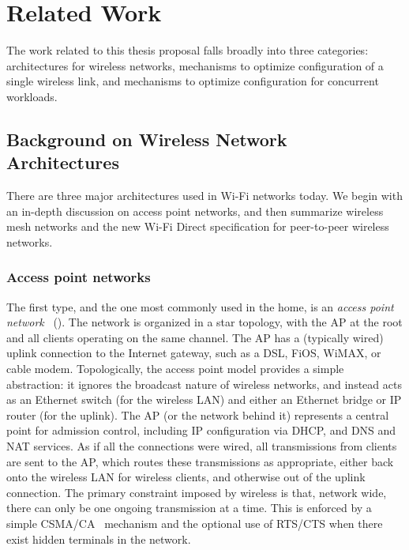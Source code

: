 \section{Related Work}
\label{sec:related}

The work related to this thesis proposal falls broadly into three categories: architectures for wireless networks, mechanisms to optimize configuration of a single wireless link, and mechanisms to optimize configuration for concurrent workloads.

\subsection{Background on Wireless Network Architectures}
There are three major architectures used in Wi-Fi networks today. We begin with an in-depth discussion on access point networks, and then summarize wireless mesh networks and the new Wi-Fi Direct specification for peer-to-peer wireless networks.

\subsubsection{Access point networks} The first type, and the one most commonly used in the home, is an \emph{access point network}~\cite{80211,nagus_homerf} (). The network is organized in a star topology, with the AP at the root and all clients operating on the same channel. The AP has a (typically wired) uplink connection to the Internet gateway, such as a DSL, FiOS, WiMAX, or cable modem. Topologically, the access point model provides a simple abstraction: it ignores the broadcast nature of wireless networks, and instead acts as an Ethernet switch (for the wireless LAN) and either an Ethernet bridge or IP router (for the uplink). The AP (or the network behind it) represents a central point for admission control, including IP configuration via DHCP, and DNS and NAT services. As if all the connections were wired, all transmissions from clients are sent to the AP, which routes these transmissions as appropriate, either back onto the wireless LAN for wireless clients, and otherwise out of the uplink connection. The primary constraint imposed by wireless is that, network wide, there can only be one ongoing transmission at a time. This is enforced by a simple CSMA/CA~\cite{karn_maca} mechanism and the optional use of RTS/CTS when there exist hidden terminals in the network.


